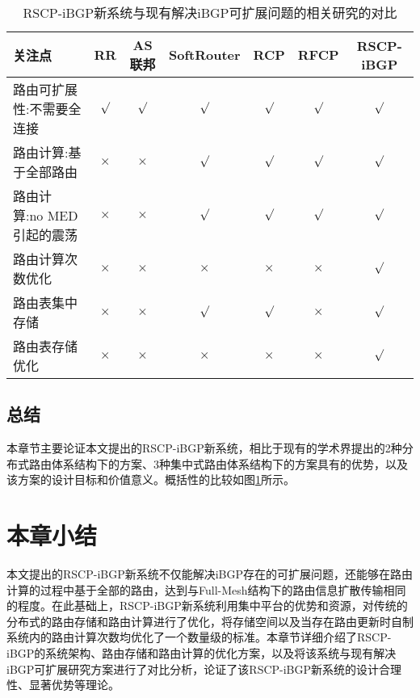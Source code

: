 \begin{table}[h]
	\centering
	\caption{RSCP-iBGP新系统与现有解决iBGP可扩展问题的相关研究的对比}
    \label{tab:compare}
	\begin{tabular}{|l|c|c|c|c|c|c|}
		\hline
		关注点 & RR & AS联邦 & SoftRouter & RCP & RFCP & RSCP-iBGP \\ \hline
		路由可扩展性:不需要全连接 &  $\surd$ &  $\surd$  & $\surd$  &$\surd$ & $\surd$  &$\surd$  \\ \hline
        路由计算:基于全部路由 & $\times$ &  $\times$  & $\surd$  &$\surd$ & $\surd$  &$\surd$  \\ \hline
        路由计算:no MED引起的震荡 &  $\times$ &  $\times$  & $\surd$  &$\surd$ & $\surd$  &$\surd$  \\ \hline
        路由计算次数优化&  $\times$ &  $\times$  & $\times$  &$\times$ & $\times$  &$\surd$  \\ \hline
        路由表集中存储&  $\times$ &  $\times$  & $\surd$  &$\surd$ & $\times$  &$\surd$  \\ \hline
        路由表存储优化&  $\times$ &  $\times$  & $\times$  &$\times$ & $\times$  &$\surd$  \\ \hline
	\end{tabular}
\end{table}

\subsection{总结}

本章节主要论证本文提出的RSCP-iBGP新系统，相比于现有的学术界提出的2种分布式路由体系结构下的方案、3种集中式路由体系结构下的方案具有的优势，以及该方案的设计目标和价值意义。概括性的比较如图\ref{tab:compare}所示。



\section{本章小结}

本文提出的RSCP-iBGP新系统不仅能解决iBGP存在的可扩展问题，还能够在路由计算的过程中基于全部的路由，达到与Full-Mesh结构下的路由信息扩散传输相同的程度。在此基础上，RSCP-iBGP新系统利用集中平台的优势和资源，对传统的分布式的路由存储和路由计算进行了优化，将存储空间以及当存在路由更新时自制系统内的路由计算次数均优化了一个数量级的标准。本章节详细介绍了RSCP-iBGP的系统架构、路由存储和路由计算的优化方案，以及将该系统与现有解决iBGP可扩展研究方案进行了对比分析，论证了该RSCP-iBGP新系统的设计合理性、显著优势等理论。

